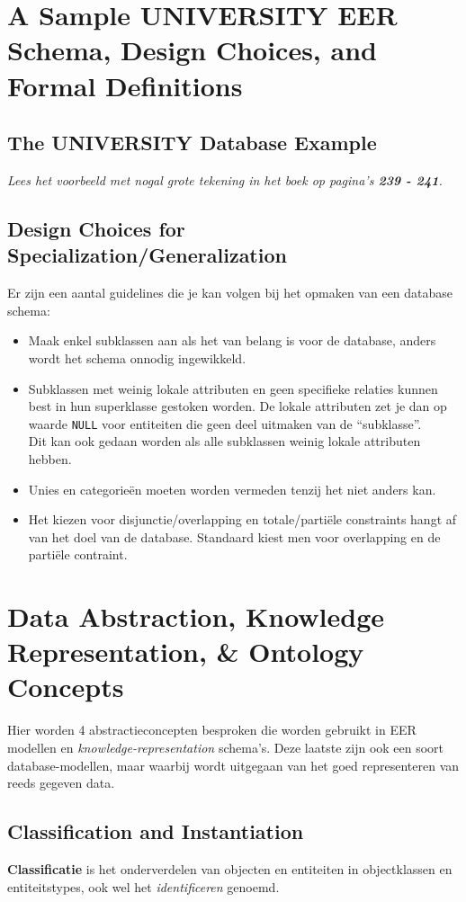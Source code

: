\section{A Sample UNIVERSITY EER Schema, Design Choices, and Formal Definitions}
\subsection{The UNIVERSITY Database Example}
\textit{Lees het voorbeeld met nogal grote tekening in het boek op pagina's \textbf{239 - 241}.}

\subsection{Design Choices for Specialization/Generalization}
Er zijn een aantal guidelines die je kan volgen bij het opmaken van een database schema:
\begin{itemize}
\item Maak enkel subklassen aan als het van belang is voor de database, anders wordt het schema onnodig ingewikkeld.
\item Subklassen met weinig lokale attributen en geen specifieke relaties kunnen best in hun superklasse gestoken worden. De lokale attributen zet je dan op waarde \texttt{NULL} voor entiteiten die geen deel uitmaken van de ``subklasse''.\\
Dit kan ook gedaan worden als alle subklassen weinig lokale attributen hebben.
\item Unies en categorie\"en moeten worden vermeden tenzij het niet anders kan.
\item Het kiezen voor disjunctie/overlapping en totale/parti\"ele constraints hangt af van het doel van de database. Standaard kiest men voor overlapping en de parti\"ele contraint.
\end{itemize}


\newpage
\section{Data Abstraction, Knowledge Representation, \& Ontology Concepts}
Hier worden 4 abstractieconcepten besproken die worden gebruikt in EER modellen en \textit{knowledge-representation} schema's. Deze laatste zijn ook een soort database-modellen, maar waarbij wordt uitgegaan van het goed representeren van reeds gegeven data.

\subsection{Classification and Instantiation}
\textbf{Classificatie} is het onderverdelen van objecten en entiteiten in objectklassen en entiteitstypes, ook wel het \textit{identificeren} genoemd. 

